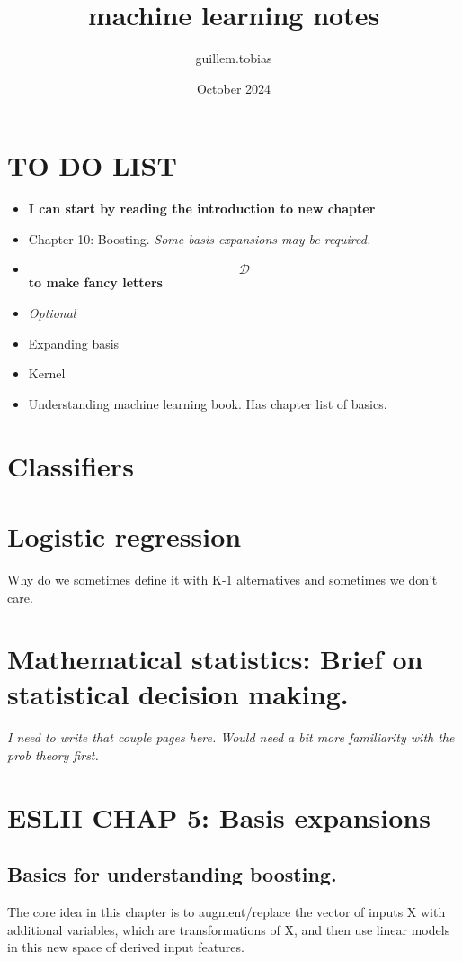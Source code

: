 \documentclass{article}
\begin{document}
\title{machine learning notes}
\author{guillem.tobias }
\date{October 2024}


\maketitle
\section{TO DO LIST}
\begin{itemize}
    \item \textbf{I can start by reading the introduction to new chapter}
    \item Chapter 10: Boosting. \textit{Some basis expansions may be required.}
    \item $$\mathcal{D}$$ \textbf{to make fancy letters}

    \item \textit{Optional}
    \item  Expanding basis 
    \item Kernel
    \item Understanding machine learning book. Has chapter list of basics.
\end{itemize}


\section{Classifiers}

\section{Logistic regression}
Why do we sometimes define it with K-1 alternatives and sometimes we don't care.

\section{Mathematical statistics: Brief on statistical decision making.}
\textit{I need to write that couple pages here. Would need a bit more familiarity with the prob theory first.}

\section{ESLII CHAP 5: Basis expansions}

\subsection{Basics for understanding boosting.}
The core idea in this chapter is to augment/replace the
vector of inputs X with additional variables, which are transformations of
X, and then use linear models in this new space of derived input features.
\end{document}
